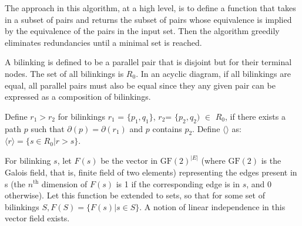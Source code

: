 \documentclass[sigplan,review,nonacm=true]{acmart}
\begin{document}
The approach in this algorithm, at a high level, is to define a function that takes in a subset of pairs and returns the subset of pairs whose equivalence is implied by the equivalence of the pairs in the input set.
Then the algorithm greedily eliminates redundancies until a minimal set is reached.

A bilinking is defined to be a parallel pair that is disjoint but for their terminal nodes. The set of all bilinkings is $R_0$.
In an acyclic diagram, if all bilinkings are equal, all parallel pairs must also be equal since they any given pair can be expressed as a composition of bilinkings.

Define $r_1>r_2$ for bilinkings $r_1$ = $\{p_1,q_1\}$, $r_2$= $\{p_2, q_2)$ $\in$ $R_0$, if there exists a path $p$ such that $\partial(p) = \partial(r_1)$ and $p$ contains $p_2$.
Define $\langle\rangle$ as:
$\langle r \rangle = \{ s\in R_0| r>s\}$.

For bilinking $s$, let $F(s)$ be the vector in $\text{GF}(2)^{|E|}$ (where $\text{GF}(2)$ is the Galois field, that is, finite field of two elements) representing the edges present in s (the $n^{\text{th}}$ dimension of $F(s)$ is 1 if the corresponding edge is in $s$, and 0 otherwise).
Let this function be extended to sets, so that for some set of bilinkings $S, F(S) = \{ F(s) | s\in S \}$. A notion of linear independence in this vector field exists.
\end{document}
